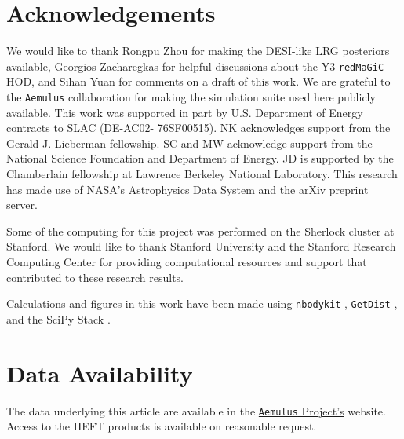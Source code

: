 \documentclass[fleqn,usenatbib]{mnras}
\newcommand{\redmagic}{\texttt{redMaGiC} }
\begin{document}
\section*{Acknowledgements}
We would like to thank Rongpu Zhou for making the DESI-like LRG posteriors available, Georgios Zacharegkas for helpful discussions about the Y3 \redmagic HOD, and Sihan Yuan for comments on a draft of this work. We are grateful to the \texttt{Aemulus} collaboration for making the simulation suite used here publicly available. This work was supported in
part by U.S. Department of Energy contracts to SLAC (DE-AC02-
76SF00515). NK acknowledges support from the Gerald J. Lieberman fellowship. SC and MW acknowledge support from the National Science Foundation and Department of Energy. JD is supported by the Chamberlain fellowship at Lawrence Berkeley National Laboratory.
This research has made use of NASA's Astrophysics Data System and the arXiv preprint server. \par
Some of the computing for this project was performed on the Sherlock cluster at Stanford. We would like to thank Stanford University and the Stanford Research Computing Center for providing computational resources and support that contributed to these research results.\par
Calculations and figures in this work have been made using \texttt{nbodykit} \citep{Hand_2018}, \texttt{GetDist} \citep{lewis2019getdist}, and the SciPy Stack \citep{2020NumPy-Array,2020SciPy-NMeth,4160265}.  
\section*{Data Availability}
The data underlying this article are available in the \href{https://aemulusproject.github.io/}{ \texttt{Aemulus} Project's} website. Access to the HEFT products is available on reasonable request.



\appendix
\end{document}
